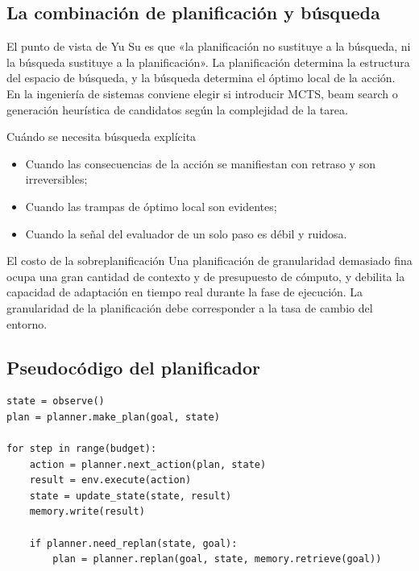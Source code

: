 \documentclass[a4paper]{article}
\begin{document}
\subsection{La combinación de planificación y búsqueda}
El punto de vista de Yu Su es que «la planificación no sustituye a la búsqueda, ni la búsqueda sustituye a la planificación». La planificación determina la estructura del espacio de búsqueda, y la búsqueda determina el óptimo local de la acción. En la ingeniería de sistemas conviene elegir si introducir MCTS, beam search o generación heurística de candidatos según la complejidad de la tarea.

\begin{knowledgebox}{Cuándo se necesita búsqueda explícita}
\begin{itemize}
    \item Cuando las consecuencias de la acción se manifiestan con retraso y son irreversibles;
    \item Cuando las trampas de óptimo local son evidentes;
    \item Cuando la señal del evaluador de un solo paso es débil y ruidosa.
\end{itemize}
\end{knowledgebox}

\begin{warningbox}{El costo de la sobreplanificación}
Una planificación de granularidad demasiado fina ocupa una gran cantidad de contexto y de presupuesto de cómputo, y debilita la capacidad de adaptación en tiempo real durante la fase de ejecución. La granularidad de la planificación debe corresponder a la tasa de cambio del entorno.
\end{warningbox}

\subsection{Pseudocódigo del planificador}
\begin{lstlisting}[caption={Un ciclo simplificado de replanificación, que enfatiza la ``actualización activada por desviación''}]
state = observe()
plan = planner.make_plan(goal, state)

for step in range(budget):
    action = planner.next_action(plan, state)
    result = env.execute(action)
    state = update_state(state, result)
    memory.write(result)

    if planner.need_replan(state, goal):
        plan = planner.replan(goal, state, memory.retrieve(goal))
\end{lstlisting}
\end{document}
